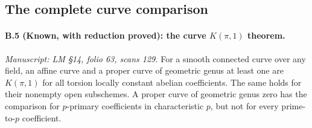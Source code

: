 \subsection{The complete curve comparison}

\paragraph{B.5 (Known, with reduction proved): the curve $K(\pi,1)$ theorem.}\label{B5}
\textit{Manuscript: LM \S14, folio 63, scans 129.}
For a smooth connected curve over any field, an affine curve and a
proper curve of geometric genus at least one are $K(\pi,1)$ for all
torsion locally constant abelian coefficients. The same holds for
their nonempty open subschemes. A proper curve of geometric genus
zero has the comparison for $p$-primary coefficients in
characteristic $p$, but not for every prime-to-$p$ coefficient.

